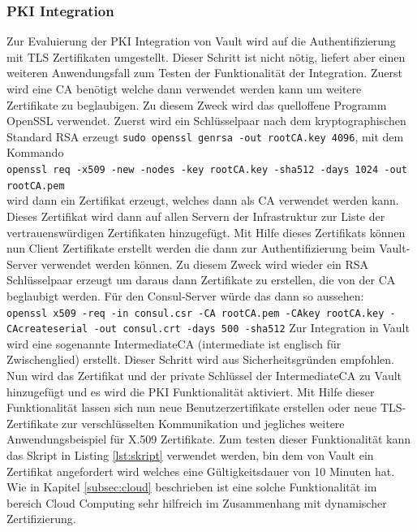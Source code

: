 \documentclass[
book,
a4paper,   
titlepage,  
halfparskip,
12pt        
]{scrartcl}
\newcommand\inline{\lstinline[basicstyle=\ttfamily]}
\begin{document}
\begin{onehalfspacing}
\subsubsection{\acs{PKI} Integration} 
Zur Evaluierung der \ac{PKI} Integration von Vault wird auf die Authentifizierung mit \ac{TLS} Zertifikaten umgestellt. Dieser Schritt ist nicht nötig, liefert aber einen weiteren Anwendungsfall zum Testen der Funktionalität der Integration. Zuerst wird eine \ac{CA} benötigt welche dann verwendet werden kann um weitere Zertifikate zu beglaubigen. Zu diesem Zweck wird das quelloffene Programm OpenSSL verwendet. Zuerst wird ein Schlüsselpaar nach dem kryptographischen Standard RSA erzeugt \inline|sudo openssl genrsa -out rootCA.key 4096|, mit dem Kommando\\ \inline|openssl req -x509 -new -nodes -key rootCA.key -sha512 -days 1024 -out rootCA.pem|\\ wird dann ein Zertifikat erzeugt, welches dann als \ac{CA} verwendet werden kann. Dieses Zertifikat wird dann auf allen Servern der Infrastruktur zur Liste der vertrauenswürdigen Zertifikaten hinzugefügt. Mit Hilfe dieses Zertifikats können nun Client Zertifikate erstellt werden die dann zur Authentifizierung beim Vault-Server verwendet werden können. Zu diesem Zweck wird wieder ein RSA Schlüsselpaar erzeugt um daraus dann Zertifikate zu erstellen, die von der \ac{CA} beglaubigt werden. Für den Consul-Server würde das dann so aussehen:\cite{openssl}\\ \inline|openssl x509 -req -in consul.csr -CA rootCA.pem -CAkey rootCA.key -CAcreateserial -out consul.crt -days 500 -sha512|\newline
Zur Integration in Vault wird eine sogenannte Intermediate\ac{CA} (intermediate ist englisch für Zwischenglied) erstellt. Dieser Schritt wird aus Sicherheitsgründen empfohlen. Nun wird das Zertifikat und der private Schlüssel der Intermediate\ac{CA} zu Vault hinzugefügt und es wird die \ac{PKI} Funktionalität aktiviert. Mit Hilfe dieser Funktionalität lassen sich nun neue Benutzerzertifikate erstellen oder neue \ac{TLS}-Zertifikate zur verschlüsselten Kommunikation und jegliches weitere Anwendungsbeispiel für X.509 Zertifikate. Zum testen dieser Funktionalität kann das Skript in Listing \vref{lst:skript} verwendet werden, bin dem von Vault ein Zertifikat angefordert wird welches eine Gültigkeitsdauer von 10 Minuten hat. Wie in Kapitel \vref{subsec:cloud} beschrieben ist eine solche Funktionalität im bereich Cloud Computing sehr hilfreich im Zusammenhang mit dynamischer Zertifizierung.  



\end{onehalfspacing}
\end{document}
